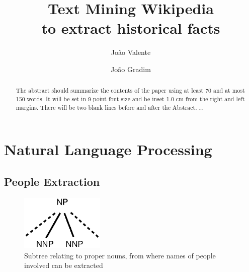 \documentclass{llncs}
\begin{document}
\mainmatter              %
%
\title{Text Mining Wikipedia\\to extract historical facts}
%
%
\author{João Valente \and João Gradim}
%
%
%

\maketitle              %

\begin{abstract}
The abstract should summarize the contents of the paper
using at least 70 and at most 150 words. It will be set in 9-point
font size and be inset 1.0 cm from the right and left margins.
There will be two blank lines before and after the Abstract. \dots
\end{abstract}

\section{Natural Language Processing}

\subsection{People Extraction}

\begin{figure}[h]
	\centering
	\includegraphics[width=40mm]{dia/people.eps}
	\caption{Subtree relating to proper nouns, from where names of people involved can be extracted}
	\label{fig:people_extraction}
\end{figure}
\end{document}
